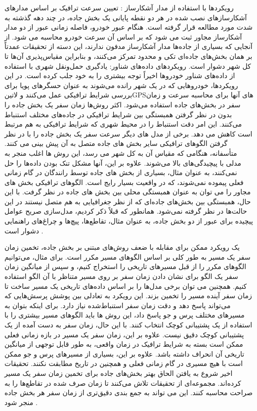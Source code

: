 رویکردها با استفاده از مدار آشکارساز : تعیین سرعت ترافیک بر اساس مدارهای آشکارسازهای نصب شده در هر دو نقطه پایانی یک بخش جاده، در چند دهه گذشته به شدت مورد مطالعه قرار گرفته است. هنگام عبور خودرو، فاصله زمانی عبور از دو مدار آشکارساز مجاور ثبت می شود که بر اساس آن سرعت خودرو محاسبه می شود. از آنجایی که بسیاری از جاده‌ها مدار آشکارساز مدفون ندارند، این دسته از تحقیقات عمدتاً بر همان بخش‌های جاده‌ای تکی و محدود تمرکز می‌کنند، و بنابراین مقیاس‌پذیری آن‌ها تا کل شهر دشوار است.
رویکردهای داده‌های شناور: یادگیری حمل‌ونقل شهری با استفاده از داده‌های شناور خودروها اخیراً توجه بیشتری را به خود جلب کرده است. در این رویکردها، خودروهایی که در یک شهر رانده می‌شوند به عنوان حسگرهای پویا برای بررسی شرایط ترافیکی عمل می‌کنند و ‌لاتین{GPS}های آنها برای محاسبه سرعت و زمان سفر در بخش‌های جاده استفاده می‌شود. اکثر روش‌ها زمان سفر یک بخش جاده را بدون در نظر گرفتن همبستگی بین شرایط ترافیکی در جاده‌های مختلف استنباط می‌کنند. این امر دقت استنباط را در محیط شهری که شرایط ترافیکی به هم مرتبط است کاهش می دهد. برخی از مدل های دیگر سرعت سفر یک بخش جاده را با در نظر گرفتن الگوهای ترافیکی سایر بخش های جاده متصل به آن پیش بینی می کنند. متأسفانه، هنگامی که مقیاس آن به کل شهر می رسد، این روش ها اغلب منجر به مدلی با پیچیدگی‌های بالا می‌شوند. علاوه بر این، آنها مشکل تنک بودن داده‌ها را حل نمی‌کنند، به عنوان مثال، بسیاری از بخش های جاده توسط رانندگان در گام زمانی فعلی پیموده نمی‌شوند، که در واقعیت بسیار رایج است. الگوهای ترافیکی بخش های مجاور را می توان به عنوان همبستگی محلی بین بخش های جاده در نظر گرفت. با این حال، همبستگی بین بخش‌های جاده‌ای که از نظر جغرافیایی به هم متصل نیستند در این حالت‌ها در نظر گرفته نمی‌شود. همانطور که قبلاً ذکر کردیم، مدل‌سازی صریح عوامل پیچیده برای عبور از دو بخش جاده، به عنوان مثال، تقاطع‌ها، پیچ‌ها و چراغ‌های راهنمایی دشوار است
.

یک رویکرد ممکن برای مقابله با ضعف روش‌های مبتنی بر بخش جاده، تخمین زمان سفر یک مسیر به طور کلی بر اساس الگوهای مسیر مکرر است. برای مثال، می‌توانیم الگوهای مکرر را از قبل مسیرهای تاریخی را استخراج کنیم، و سپس از میانگین زمان سفر یک الگو برای نشان دادن زمان سفر بر روی مسیر متناظر با آن الگو استفاده کنیم. همچنین می توان برخی مدل‌ها را بر اساس داده‌های تاریخی یک مسیر ساخت تا زمان سفر آینده مسیر را تخمین بزند. این رویکرد به تعادلی بین پوشش پرسش‌هایی که می‌تواند پاسخ دهد و دقت زمان سفر استنباط‌شده نیاز دارد. برای اینکه بتوان به مسیرهای مختلف پرس و جو پاسخ داد، این روش ها باید الگوهای مسیر بیشتری را با استفاده از یک پشتیبانی کوچک انتخاب کنند. با این حال، زمان سفر به دست آمده از یک پشتیبانی کوچک دقیق نیست. علاوه بر این، زمان سفر یک مسیر در بازه زمانی فعلی ممکن است بسته به شرایط ترافیک در زمان واقعی، به طور قابل توجهی از میانگین تاریخی آن انحراف داشته باشد. علاوه بر این، بسیاری از مسیرهای پرس و جو ممکن است با هیچ مسیری در گام زمانی فعلی و همچنین در تاریخ مطابقت نکنند. تحقیقات اخیر شروع به یافتن الحاق بهتر بخش‌های جاده برای تخمین زمان سفر یک مسیر کرده‌اند. مجموعه‌ای از تحقیقات تلاش می‌کنند تا زمان صرف شده در تقاطع‌ها را به صراحت محاسبه کنند. این می تواند به جمع بندی دقیق‌تری از زمان سفر هر بخش جاده منجر شود
.


